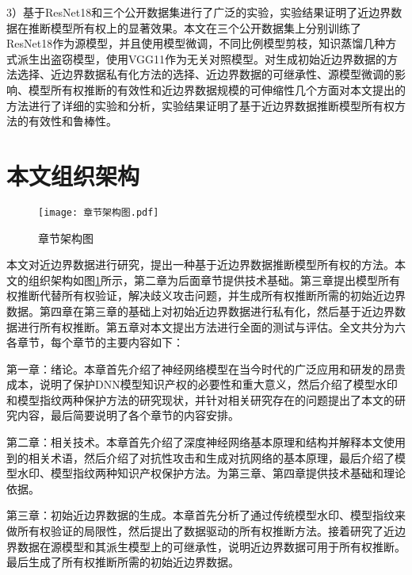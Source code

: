 3）基于ResNet18\cite{he2016deep}和三个公开数据集进行了广泛的实验，实验结果证明了近边界数据在推断模型所有权上的显著效果。本文在三个公开数据集上分别训练了ResNet18作为源模型，并且使用模型微调，不同比例模型剪枝，知识蒸馏几种方式派生出盗窃模型，使用VGG11\cite{simonyan2014very}作为无关对照模型。对生成初始近边界数据的方法选择、近边界数据私有化方法的选择、近边界数据的可继承性、源模型微调的影响、模型所有权推断的有效性和近边界数据规模的可伸缩性几个方面对本文提出的方法进行了详细的实验和分析，实验结果证明了基于近边界数据推断模型所有权方法的有效性和鲁棒性。

\section{本文组织架构}

\begin{figure}[htb]%
	\centering
		\setlength{\abovecaptionskip}{5mm} %
	\texttt{[image: 章节架构图.pdf]}
	\caption{章节架构图}
	\label{章节架构图}
	\end {figure}
	
本文对近边界数据进行研究，提出一种基于近边界数据推断模型所有权的方法。本文的组织架构如图\ref{章节架构图}所示，第二章为后面章节提供技术基础。第三章提出模型所有权推断代替所有权验证，解决歧义攻击问题，并生成所有权推断所需的初始近边界数据。第四章在第三章的基础上对初始近边界数据进行私有化，然后基于近边界数据进行所有权推断。第五章对本文提出方法进行全面的测试与评估。全文共分为六各章节，每个章节的主要内容如下：

第一章：绪论。本章首先介绍了神经网络模型在当今时代的广泛应用和研发的昂贵成本，说明了保护DNN模型知识产权的必要性和重大意义，然后介绍了模型水印和模型指纹两种保护方法的研究现状，并针对相关研究存在的问题提出了本文的研究内容，最后简要说明了各个章节的内容安排。

第二章：相关技术。本章首先介绍了深度神经网络基本原理和结构并解释本文使用到的相关术语，然后介绍了对抗性攻击和生成对抗网络的基本原理，最后介绍了模型水印、模型指纹两种知识产权保护方法。为第三章、第四章提供技术基础和理论依据。

第三章：初始近边界数据的生成。本章首先分析了通过传统模型水印、模型指纹来做所有权验证的局限性，然后提出了数据驱动的所有权推断方法。接着研究了近边界数据在源模型和其派生模型上的可继承性，说明近边界数据可用于所有权推断。最后生成了所有权推断所需的初始近边界数据。

